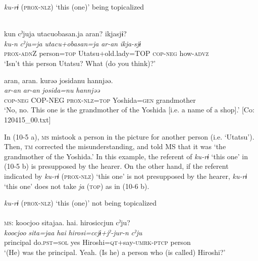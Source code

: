 \ea\label{ex:10.5}   \textit{ku-rɨ} (\textsc{prox}-\textsc{nlz}) ‘this (one)’ being topicalized\\\\
  \begin{xlist}[b. \textsc{tm}:]
   \glll kun  cˀjuja  utacuobasan.ja  aran?  ikjasjɨ?\\
      \textit{ku-n}  \textit{cˀju=ja}  \textit{utacu+obasan=ja}  \textit{ar-an}  \textit{ikja-sjɨ}\\
      \textsc{prox}-\textsc{adn}Z  person=\textsc{top}  Utatsu+old.lady=TOP  \textsc{cop}-\textsc{neg}  how-\textsc{advz}\\
      \glt ‘Isn’t this person Utatsu? What (do you think)?’

    \glll    aran,  aran.  kurəə  josidanu  hannjəə.\\
      \textit{ar-an}  \textit{ar-an}  \textit{}  \textit{josida=nu}  \textit{hannjəə}\\
      \textsc{cop}-\textsc{neg}  COP-NEG  \textsc{prox}-\textsc{nlz}=\textsc{top}  Yoshida=\textsc{gen}  grandmother\\
      \glt       ‘No, no. This one is the grandmother of the Yoshida [i.e. a name of a shop].’ [Co: 120415\_00.txt]
  \end{xlist}
\z

In (10-5 a), \textsc{ms} mistook a person in the picture for another person (i.e. ‘Utatsu’). Then, \textsc{tm} corrected the misunderstanding, and told MS that it was ‘the grandmother of the Yoshida.’ In this example, the referent of \textit{ku-rɨ} ‘this one’ in (10-5 b) is presupposed by the hearer. On the other hand, if the referent indicated by \textit{ku-rɨ} (\textsc{prox}-\textsc{nlz}) ‘this one’ is not presupposed by the hearer, \textit{ku-rɨ} ‘this one’ does not take \textit{ja} (\textsc{top}) as in (10-6 b).

\ea\label{ex:10.6}   \textit{ku-rɨ} (\textsc{prox}-\textsc{nlz}) ‘this (one)’ not being topicalized\\\\
  \ea \textsc{ms}: \glll {\textbar}koocjoo  sita{\textbar}jaa.  {\textbar}hai{\textbar}.  hirosiccjun  cˀju?\\
      \textit{koocjoo}  \textit{sita=jaa}  \textit{hai}  \textit{hirosi=ccjɨ+jˀ-jur-n}  \textit{cˀju}\\
      principal  do.\textsc{pst}=\textsc{sol}  yes  Hiroshi=\textsc{qt}+say-\textsc{umrk}-\textsc{ptcp}  person\\
      \glt ‘(He) was the principal. Yeah. (Is he) a person who (is called) Hiroshi?’

